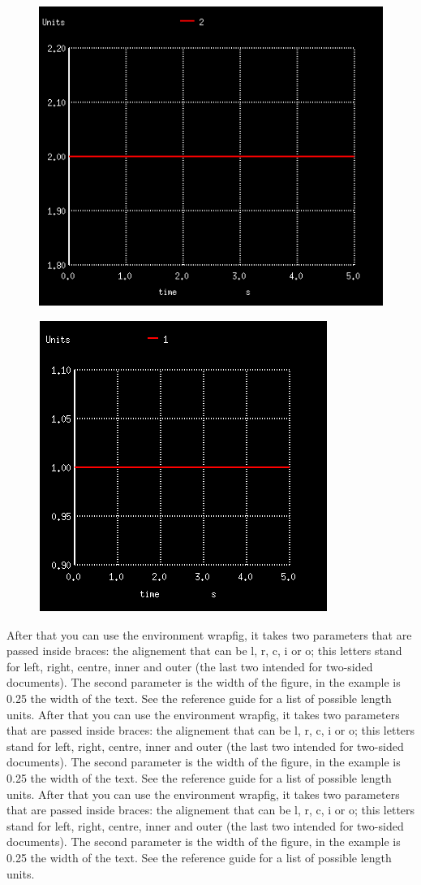 \documentclass{report}
\begin{document}
 
 \begin{figure}[b]
\centering
\begin{minipage}{.5\textwidth}
  \centering
  \includegraphics[width=.4\linewidth]{Figures/oneFig.png}
  \label{fig:test8}
\end{minipage}%
\begin{minipage}{.5\textwidth}
  \centering
  \includegraphics[width=.4\linewidth]{Figures/twoFig.png}
  \label{fig:test7}
\end{minipage}
\end{figure}


 


 After that you can use the environment wrapfig, it takes two parameters that are passed inside braces: the alignement that can be l, r, c, i or o; this letters stand for left, right, centre, inner and outer (the last two intended for two-sided documents). The second parameter is the width of the figure, in the example is 0.25 the width of the text. See the reference guide for a list of possible length units.
 After that you can use the environment wrapfig, it takes two parameters that are passed inside braces: the alignement that can be l, r, c, i or o; this letters stand for left, right, centre, inner and outer (the last two intended for two-sided documents). The second parameter is the width of the figure, in the example is 0.25 the width of the text. See the reference guide for a list of possible length units.
 After that you can use the environment wrapfig, it takes two parameters that are passed inside braces: the alignement that can be l, r, c, i or o; this letters stand for left, right, centre, inner and outer (the last two intended for two-sided documents). The second parameter is the width of the figure, in the example is 0.25 the width of the text. See the reference guide for a list of possible length units. \cite{sharelatex,thirdRef}
\end{document}

